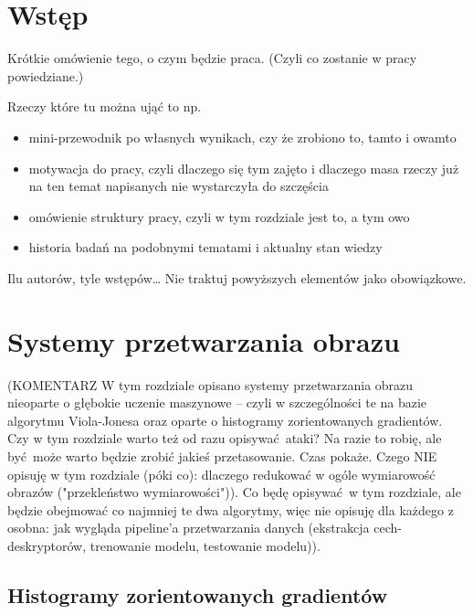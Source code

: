 \documentclass[12pt,a4paper,leqno,oneside,titlepage]{book}
\begin{document}
\mainmatter

\chapter*{Wstęp}

Krótkie omówienie tego, o czym będzie praca. (Czyli co zostanie w pracy powiedziane.)

Rzeczy które tu można ująć to np. 
\begin{itemize}
\item mini-przewodnik po własnych wynikach, czy że zrobiono to, tamto i owamto
\item motywacja do pracy, czyli dlaczego się tym zajęto i dlaczego masa rzeczy już na ten temat napisanych nie wystarczyła do szczęścia
\item omówienie struktury pracy, czyli w tym rozdziale jest to, a tym owo
\item historia badań na podobnymi tematami i aktualny stan wiedzy
\end{itemize}

Ilu autorów, tyle wstępów\ldots{} Nie traktuj powyższych elementów jako obowiązkowe.

\chapter{Systemy przetwarzania obrazu}%

(KOMENTARZ W tym rozdziale opisano systemy przetwarzania obrazu nieoparte o głębokie uczenie maszynowe -- czyli w szczególności te na bazie algorytmu Viola-Jonesa oraz oparte o histogramy zorientowanych gradientów.
Czy w tym rozdziale warto też od razu opisywać ataki? Na razie to robię, ale być może warto będzie zrobić jakieś przetasowanie. Czas pokaże.
Czego NIE opisuję w tym rozdziale (póki co): dlaczego redukować w ogóle wymiarowość obrazów ("przekleństwo wymiarowości")).
Co będę opisywać w tym rozdziale, ale będzie obejmować co najmniej te dwa algorytmy, więc nie opisuję dla każdego z osobna: jak wygląda pipeline'a przetwarzania danych (ekstrakcja cech-deskryptorów, trenowanie modelu, testowanie modelu)).

%
%
%
%
%
%
%
%
%
%
%
%
%
%
%
%
%
%
\section{Histogramy zorientowanych gradientów}
\end{document}
